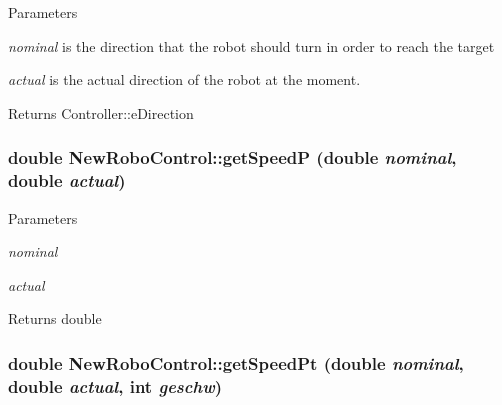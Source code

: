 \begin{DoxyParams}{Parameters}
\item[{\em nominal}]is the direction that the robot should turn in order to reach the target \item[{\em actual}]is the actual direction of the robot at the moment. \end{DoxyParams}
\begin{DoxyReturn}{Returns}
Controller::eDirection 
\end{DoxyReturn}
\hypertarget{classNewRoboControl_ab2f2407b40c535ed734049e8e1ed71e6}{
\subsubsection[{getSpeedP}]{\setlength{\rightskip}{0pt plus 5cm}double NewRoboControl::getSpeedP (double {\em nominal}, \/  double {\em actual})}}
\label{classNewRoboControl_ab2f2407b40c535ed734049e8e1ed71e6}

\begin{DoxyParams}{Parameters}
\item[{\em nominal}]\item[{\em actual}]\end{DoxyParams}
\begin{DoxyReturn}{Returns}
double 
\end{DoxyReturn}
\hypertarget{classNewRoboControl_ac1f5cb8932193d5e8315bb19aeddb3fa}{
\subsubsection[{getSpeedPt}]{\setlength{\rightskip}{0pt plus 5cm}double NewRoboControl::getSpeedPt (double {\em nominal}, \/  double {\em actual}, \/  int {\em geschw})}}
\label{classNewRoboControl_ac1f5cb8932193d5e8315bb19aeddb3fa}

